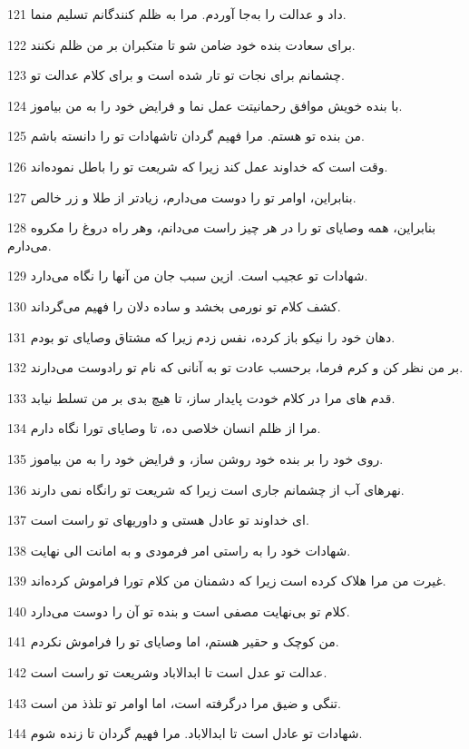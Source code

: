 \par 121 داد و عدالت را به‌جا آوردم. مرا به ظلم کنندگانم تسلیم منما.
\par 122 برای سعادت بنده خود ضامن شو تا متکبران بر من ظلم نکنند.
\par 123 چشمانم برای نجات تو تار شده است و برای کلام عدالت تو.
\par 124 با بنده خویش موافق رحمانیتت عمل نما و فرایض خود را به من بیاموز.
\par 125 من بنده تو هستم. مرا فهیم گردان تاشهادات تو را دانسته باشم.
\par 126 وقت است که خداوند عمل کند زیرا که شریعت تو را باطل نموده‌اند.
\par 127 بنابراین، اوامر تو را دوست می‌دارم، زیادتر از طلا و زر خالص.
\par 128 بنابراین، همه وصایای تو را در هر چیز راست می‌دانم، وهر راه دروغ را مکروه می‌دارم.
\par 129 شهادات تو عجیب است. ازین سبب جان من آنها را نگاه می‌دارد.
\par 130 کشف کلام تو نورمی بخشد و ساده دلان را فهیم می‌گرداند.
\par 131 دهان خود را نیکو باز کرده، نفس زدم زیرا که مشتاق وصایای تو بودم.
\par 132 بر من نظر کن و کرم فرما، برحسب عادت تو به آنانی که نام تو رادوست می‌دارند.
\par 133 قدم های مرا در کلام خودت پایدار ساز، تا هیچ بدی بر من تسلط نیابد.
\par 134 مرا از ظلم انسان خلاصی ده، تا وصایای تورا نگاه دارم.
\par 135 روی خود را بر بنده خود روشن ساز، و فرایض خود را به من بیاموز.
\par 136 نهرهای آب از چشمانم جاری است زیرا که شریعت تو رانگاه نمی دارند.
\par 137 ‌ای خداوند تو عادل هستی و داوریهای تو راست است.
\par 138 شهادات خود را به راستی امر فرمودی و به امانت الی نهایت.
\par 139 غیرت من مرا هلاک کرده است زیرا که دشمنان من کلام تورا فراموش کرده‌اند.
\par 140 کلام تو بی‌نهایت مصفی است و بنده تو آن را دوست می‌دارد.
\par 141 من کوچک و حقیر هستم، اما وصایای تو را فراموش نکردم.
\par 142 عدالت تو عدل است تا ابدالاباد وشریعت تو راست است.
\par 143 تنگی و ضیق مرا درگرفته است، اما اوامر تو تلذذ من است.
\par 144 شهادات تو عادل است تا ابدالاباد. مرا فهیم گردان تا زنده شوم.
